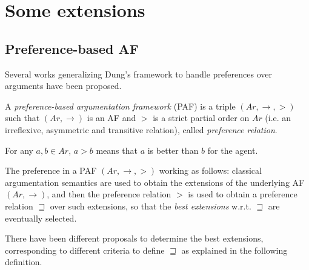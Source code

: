 \section{Some extensions}



\subsection{Preference-based AF}



Several works generalizing Dung's framework to handle preferences over arguments have been proposed. 



\begin{df}
    A \textit{preference-based argumentation framework} (PAF) is a triple $(Ar,\to,>)$ such that $(Ar,\to)$ is an AF and $>$ is a strict partial order on $Ar$ (i.e. an irreflexive, asymmetric and transitive relation), 
    called \textit{preference relation}.    
\end{df}



For any $a,b \in Ar$, 
$a > b$ means that $a$ is better than $b$ for the agent. 



The preference in a PAF $(Ar,\to,>)$ working as follows: 
classical argumentation semantics are used to obtain the extensions of the underlying AF $(Ar,\to)$, 
and then the preference relation $>$ is used to obtain a preference relation $\sqsupseteq$ over such extensions, 
so that the \textit{best extensions} w.r.t. $\sqsupseteq$ are eventually selected.


There have been different proposals to determine the best extensions, 
corresponding to different criteria to define $\sqsupseteq$ as explained in the following definition.

























